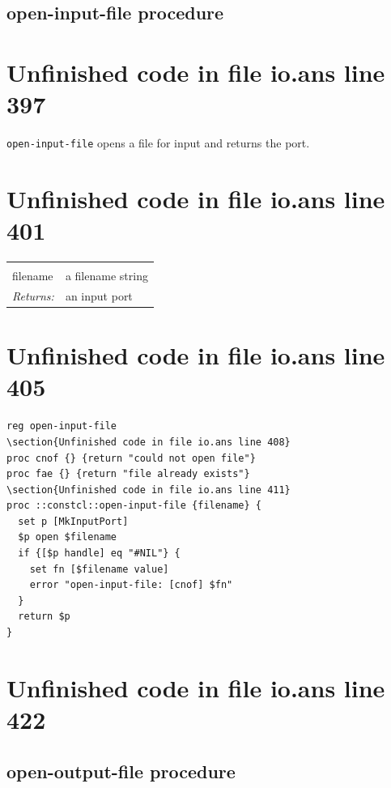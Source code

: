 \documentclass[twoside,9pt]{report}
\begin{document}
\subsection{open-input-file procedure}
\label{open-input-file-procedure}
\section{Unfinished code in file io.ans line 397}


\texttt{open-input-file} opens a file for input and returns the port.

\section{Unfinished code in file io.ans line 401}
\noindent\begin{tabular}{ |p{1.9cm} p{8cm}| }
\hline
\rowcolor[HTML]{CCCCCC} \multicolumn{2}{|l|}{\bf open-input-file (public)} \\
filename & a filename string \\
\textit{Returns:} & an input port \\
\hline
\end{tabular}
\section{Unfinished code in file io.ans line 405}
\begin{lstlisting}
reg open-input-file
\section{Unfinished code in file io.ans line 408}
proc cnof {} {return "could not open file"}
proc fae {} {return "file already exists"}
\section{Unfinished code in file io.ans line 411}
proc ::constcl::open-input-file {filename} {
  set p [MkInputPort]
  $p open $filename
  if {[$p handle] eq "#NIL"} {
    set fn [$filename value]
    error "open-input-file: [cnof] $fn"
  }
  return $p
}
\end{lstlisting}
\section{Unfinished code in file io.ans line 422}
\subsection{open-output-file procedure}
\label{open-output-file-procedure}
\end{document}
